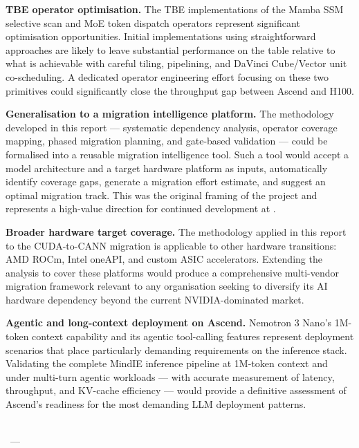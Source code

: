 \textbf{TBE operator optimisation.} The TBE implementations
of the Mamba SSM selective scan and MoE token dispatch operators
represent significant optimisation opportunities. Initial
implementations using straightforward approaches are likely
to leave substantial performance on the table relative to what
is achievable with careful tiling, pipelining, and DaVinci
Cube/Vector unit co-scheduling. A dedicated operator
engineering effort focusing on these two primitives could
significantly close the throughput gap between Ascend and H100.

\textbf{Generalisation to a migration intelligence platform.}
The methodology developed in this report — systematic
dependency analysis, operator coverage mapping, phased migration
planning, and gate-based validation — could be formalised into
a reusable migration intelligence tool. Such a tool would
accept a model architecture and a target hardware platform
as inputs, automatically identify coverage gaps, generate a
migration effort estimate, and suggest an optimal migration
track. This was the original framing of the project and
represents a high-value direction for continued development
at \CompanyName{}.

\textbf{Broader hardware target coverage.} The methodology
applied in this report to the CUDA-to-CANN migration is
applicable to other hardware transitions: AMD ROCm, Intel
oneAPI, and custom ASIC accelerators. Extending the analysis
to cover these platforms would produce a comprehensive
multi-vendor migration framework relevant to any organisation
seeking to diversify its AI hardware dependency beyond the
current NVIDIA-dominated market.

\textbf{Agentic and long-context deployment on Ascend.}
Nemotron 3 Nano's 1M-token context capability and its
agentic tool-calling features represent deployment scenarios
that place particularly demanding requirements on the
inference stack. Validating the complete MindIE inference
pipeline at 1M-token context and under multi-turn agentic
workloads — with accurate measurement of latency, throughput,
and KV-cache efficiency — would provide a definitive assessment
of Ascend's readiness for the most demanding LLM deployment
patterns.

\vspace{1.5cm}

\begin{flushright}
  \textit{\AuthorFullName}\\
  \ReportDate{}~—~\ReportLocation
\end{flushright}
